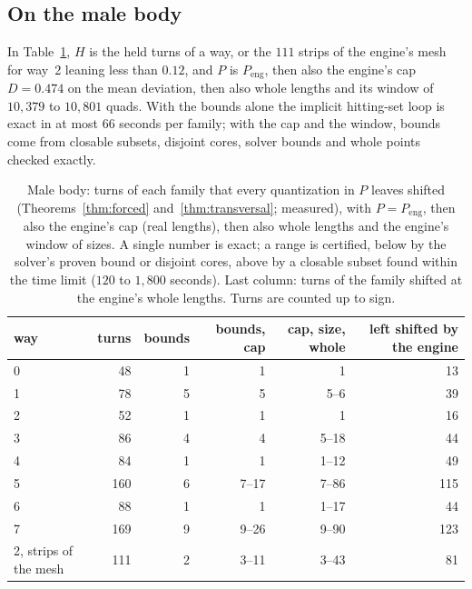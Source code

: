 \documentclass[11pt,a4paper]{article}
\begin{document}
\subsection{On the male body}

In Table~\ref{tab:forced}, $H$ is the held turns of a way, or the $111$
strips of the engine's mesh for way~2 leaning less than $0.12$, and $P$ is
$P_{\mathrm{eng}}$, then also the engine's cap $D = 0.474$ on the mean
deviation, then also whole lengths and its window of $10{,}379$ to $10{,}801$
quads. With the bounds alone the implicit hitting-set loop is exact in at most
$66$ seconds per family; with the cap and the window, bounds come from
closable subsets, disjoint cores, solver bounds and whole points checked
exactly.

\begin{table}[t]
\centering
\small
\begin{tabular}{lrrrrr}
\toprule
way & turns & bounds & bounds, cap & cap, size, whole & left shifted by the engine \\
\midrule
0 & 48 & 1 & 1 & 1 & 13 \\
1 & 78 & 5 & 5 & 5--6 & 39 \\
2 & 52 & 1 & 1 & 1 & 16 \\
3 & 86 & 4 & 4 & 5--18 & 44 \\
4 & 84 & 1 & 1 & 1--12 & 49 \\
5 & 160 & 6 & 7--17 & 7--86 & 115 \\
6 & 88 & 1 & 1 & 1--17 & 44 \\
7 & 169 & 9 & 9--26 & 9--90 & 123 \\
\midrule
2, strips of the mesh & 111 & 2 & 3--11 & 3--43 & 81 \\
\bottomrule
\end{tabular}
\caption{Male body: turns of each family that every quantization in $P$ leaves
shifted (Theorems~\ref{thm:forced} and~\ref{thm:transversal}; measured), with
$P = P_{\mathrm{eng}}$, then also the engine's cap (real lengths), then also
whole lengths and the engine's window of sizes. A single number is exact; a
range is certified, below by the solver's proven bound or disjoint cores,
above by a closable subset found within the time limit ($120$ to $1{,}800$
seconds). Last column: turns of the family shifted at the engine's whole
lengths. Turns are counted up to sign.}
\label{tab:forced}
\end{table}
\end{document}

